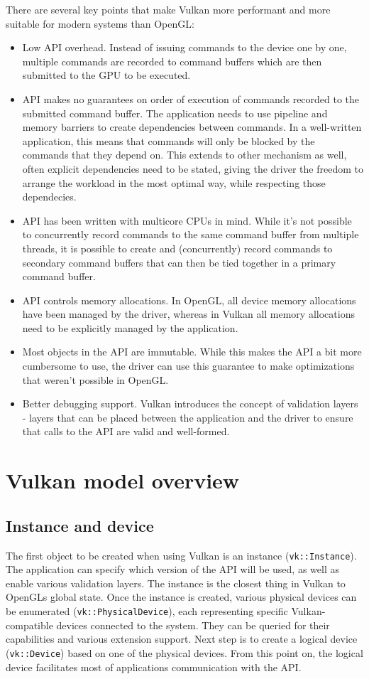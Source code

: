 \documentclass[times, utf8, zavrsni, numeric]{fer}
\begin{document}
There are several key points that make Vulkan more performant and more suitable for modern systems than OpenGL:
\begin{itemize}
	\item Low API overhead. Instead of issuing commands to the device one by one, multiple commands are recorded to command buffers which are then submitted to the GPU to be executed.
	\item API makes no guarantees on order of execution of commands recorded to the submitted command buffer. The application needs to use pipeline and memory barriers to create dependencies between commands. In a well-written application, this means that commands will only be blocked by the commands that they depend on. This extends to other mechanism as well, often explicit dependencies need to be stated, giving the driver the freedom to arrange the workload in the most optimal way, while respecting those dependecies.
	\item API has been written with multicore CPUs in mind. While it's not possible to concurrently record commands to the same command buffer from multiple threads, it is possible to create and (concurrently) record commands to secondary command buffers that can then be tied together in a primary command buffer.
	\item API controls memory allocations. In OpenGL, all device memory allocations have been managed by the driver, whereas in Vulkan all memory allocations need to be explicitly managed by the application.
	\item Most objects in the API are immutable. While this makes the API a bit more cumbersome to use, the driver can use this guarantee to make optimizations that weren't possible in OpenGL.
	\item Better debugging support. Vulkan introduces the concept of validation layers - layers that can be placed between the application and the driver to ensure that calls to the API are valid and well-formed.
\end{itemize}

\section{Vulkan model overview}
\subsection{Instance and device}
The first object to be created when using Vulkan is an instance (\texttt{vk::Instance}). The application can specify which version of the API will be used, as well as enable various validation layers. The instance is the closest thing in Vulkan to OpenGLs global state. Once the instance is created, various physical devices can be enumerated (\texttt{vk::PhysicalDevice}), each representing specific Vulkan-compatible devices connected to the system. They can be queried for their capabilities and various extension support. Next step is to create a logical device (\texttt{vk::Device}) based on one of the physical devices. From this point on, the logical device facilitates most of applications communication with the API.
\end{document}
